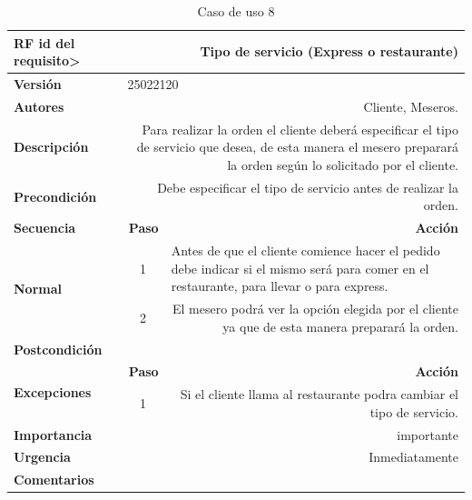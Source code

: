 \documentclass[conference]{IEEEtran}
\begin{document}
\begin{table}[H]
  \centering
   \begin{adjustbox}{width=0.45\textwidth}
    \begin{tabular}{|p{11.215em}|r|r|}
    \toprule
    \textbf{RF id del requisito>} & \multicolumn{2}{p{37.355em}|}{\textbf{Tipo de servicio (Express o restaurante)}} \\
    \midrule
    \textbf{Versión} & \multicolumn{2}{l|}{25022120} \\
    \midrule
    \textbf{Autores} & \multicolumn{2}{p{37.355em}|}{Cliente, Meseros.} \\
    \midrule
    \textbf{Descripción} & \multicolumn{2}{p{37.355em}|}{Para realizar la orden el cliente deberá especificar el tipo de servicio que desea, de esta manera el mesero preparará la orden según lo solicitado por el cliente.} \\
    \midrule
    \textbf{Precondición} & \multicolumn{2}{p{37.355em}|}{Debe especificar el tipo de servicio antes de realizar la orden.} \\
    \midrule
    \textbf{Secuencia} & \multicolumn{1}{p{5.355em}|}{\textbf{Paso}} & \multicolumn{1}{p{32em}|}{\textbf{Acción}} \\
    \midrule
    \multirow{3}[4]{*}{\textbf{Normal}} & \multicolumn{1}{c|}{\multirow{2}[2]{*}{1}} & \multicolumn{1}{l|}{\multirow{2}[2]{*}{Antes de que el cliente comience hacer el pedido debe indicar si el mismo será para comer en el restaurante, para llevar o para express.}} \\
    \multicolumn{1}{|c|}{} & \multicolumn{1}{c|}{} &  \\
\cmidrule{2-3}    \multicolumn{1}{|c|}{} & \multicolumn{1}{c|}{2} & \multicolumn{1}{p{32em}|}{El mesero podrá ver la opción elegida por el cliente ya que de esta manera preparará la orden.} \\
    \midrule
    \textbf{Postcondición} & \multicolumn{2}{r|}{} \\
    \midrule
    \multirow{2}[4]{*}{\textbf{Excepciones}} & \multicolumn{1}{p{5.355em}|}{\textbf{Paso}} & \multicolumn{1}{p{32em}|}{\textbf{Acción}} \\
\cmidrule{2-3}    \multicolumn{1}{|c|}{} & \multicolumn{1}{c|}{1} & \multicolumn{1}{p{32em}|}{Si el cliente llama al restaurante podra cambiar el tipo de servicio.} \\
    \midrule
    \textbf{Importancia} & \multicolumn{2}{p{37.355em}|}{importante } \\
    \midrule
    \textbf{Urgencia} & \multicolumn{2}{p{37.355em}|}{Inmediatamente} \\
    \midrule
    \textbf{Comentarios} & \multicolumn{2}{r|}{} \\
    \bottomrule
    \end{tabular}%
    \end{adjustbox}
    \vspace{0.2cm}
    \caption{Caso de uso 8}
  \label{tab:addlabel}%
\end{table}%
\end{document}

